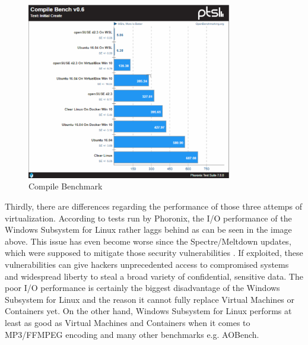 \documentclass[utf8,biblatex, ngerman, english]{lni}
\begin{document}
\begin{figure}
  \centering
  \includegraphics[width=0.8\textwidth]{CompileSpeed.pdf}
  \caption{Compile Benchmark} %
  \label{img:container}
\end{figure}

Thirdly, there are differences regarding the performance of those three attemps of virtualization. According to tests run by Phoronix, the I/O performance of the Windows Subsystem for Linux rather laggs behind as can be seen in the image above. This issue has even become worse since the Spectre/Meltdown updates, which were supposed to mitigate those security vulnerabilities . \glqq If exploited, these vulnerabilities can give hackers unprecedented access to compromised systems and widespread liberty to steal a broad variety of confidential, sensitive data. \grqq \cite{Md18} The poor I/O performance is certainly the biggest disadvantage of the Windows Subsystem for Linux and the reason it cannot fully replace Virtual Machines or Containers yet. On the other hand, Windows Subsystem for Linux performs at least as good as Virtual Machines and Containers when it comes to MP3/FFMPEG encoding and many other benchmarks e.g. AOBench.\cite{LP18}
\end{document}
